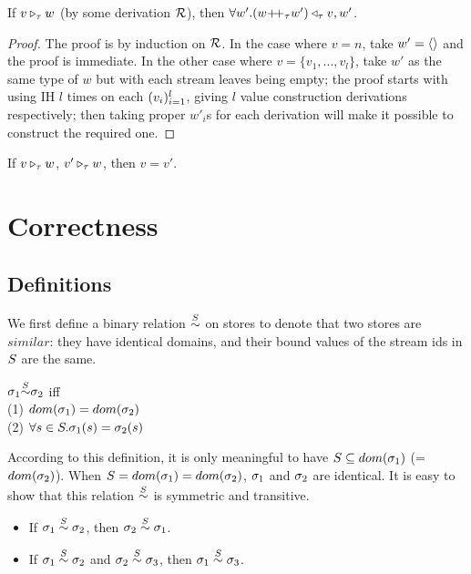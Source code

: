 \begin{lem}
	If $\ValRep{v}{\tau}{w}$ (by some derivation $\MR$), then $\forall w'.\Vtransb{(w {\++}_{\tau} w')}{\tau}{v}{w'}$. 
\end{lem}
\begin{proof}
	The proof is by induction on $\MR$. In the case where $v = n$, take $w' = \emptyv$ and the proof is immediate.
	In the other case where $v = \{v_1,...,v_l\}$, take $w'$ as the same type of $w$ but with each stream leaves being empty; 
	the proof starts with using IH $l$ times on each $\l{v_i}$, giving $l$ value construction derivations respectively; then taking proper $w'_i$s for each derivation will make it possible to construct the required one.
\end{proof}


\begin{cor}
	If $\ValRep{v}{\tau}{w}$, $\ValRep{v'}{\tau}{w}$,
	then $v=v'$.
\end{cor}



\section{Correctness}

\subsection{Definitions}
We first define a binary relation $\~\S$ on stores to denote that two stores are $similar$: they have identical domains, and their bound values of the stream ids in $\S$ are the same. 


\begin{defi}
	\label{def-sgm-sim}
	
	$\sgm_1 {\~{\S}} \sgm_2 $
	iff \\
	(1) $dom(\sgm_1) = dom(\sgm_2)$ \\
	(2) $\forall s \in \S.\sgm_1(s)= \sgm_2(s)$ \\
\end{defi}

According to this definition, it is only meaningful to have $\S  \subseteq dom(\sgm_1)$ (= $dom(\sgm_2)$).  
When $\S = dom(\sgm_1) = dom(\sgm_2)$, $\sgm_1$ and $\sgm_2$ are identical. 
It is easy to show that this relation $\overset{\S}{\sim}$ is symmetric and transitive.
\begin{itemize}
	\item If $\sgm_1 \~\S \sgm_2$, then $\sgm_2 \~\S \sgm_1$.
	\item If $\sgm_1 \~\S \sgm_2$ and $\sgm_2 \~\S \sgm_3$, then $\sgm_1 \~\S \sgm_3$.
\end{itemize}


